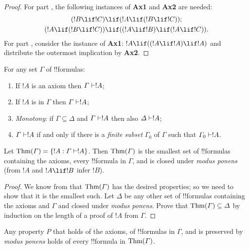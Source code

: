 \documentclass[../../include/open-logic-section]{subfiles}
\begin{document}
\begin{proof}
For part , the following instances
of \textbf{Ax1} and \textbf{Ax2} are needed:
\begin{align*}
  (!B \lif !C) & \lif (!A \lif (!B \lif !C)); \\
  (!A \lif (!B \lif !C)) & \lif ((!A \lif !B) \lif
    (!A \lif !C)).
\end{align*}
For part , consider the instance of
\textbf{Ax1}: $!A \lif ((!A \lif !A) \lif
!A)$ and distribute the outermost implication by \textbf{Ax2}.
\end{proof}

\begin{prop}
For any set $\Gamma$ of !!{formula}s:
\begin{enumerate}
\item If $!A$ is an axiom then $\Gamma \Proves !A$;
\item If $!A$ is in $\Gamma$ then $\Gamma \Proves
  !A$;
\item \emph{Monotony}: if $\Gamma \subseteq \Delta$ and $\Gamma
  \Proves !A$ then also $\Delta \Proves
  !A$;
\item $\Gamma \Proves !A$ if and only if there is a \emph{finite
  subset} $\Gamma_0$ of $\Gamma$ such that $\Gamma_0 \Proves !A$.
\end{enumerate}
\end{prop}

\begin{thm}
Let $\Thms{\Gamma} = \Setabs{!A}{\Gamma \Proves !A}$. Then
$\mathrm{Thm}(\Gamma)$ is the smallest set of !!{formula}s containing the
axioms, every !!{formula} in $\Gamma$, and is closed under \emph{modus
  ponens} (from $!A$ and $!A \lif !B$ infer $!B$).
\end{thm} 

\begin{proof}
We know from  that $\mathrm{Thm}(\Gamma)$ has the desired
properties; so we need to show that it is the smallest such. Let
$\Delta$ be any other set of !!{formula}s containing the axioms and
$\Gamma$ and closed under \emph{modus ponens}. Prove that
$\mathrm{Thm}(\Gamma) \subseteq \Delta$ by induction on the length of a proof
of $!A$ from $\Gamma$.
\end{proof}

\begin{cor}
Any property $P$ that holds of the axioms, of !!{formula}s in
$\Gamma$, and is preserved by \emph{modus ponens} holds of every
!!{formula} in $\mathrm{Thm}(\Gamma)$.
\end{cor}
\end{document}

